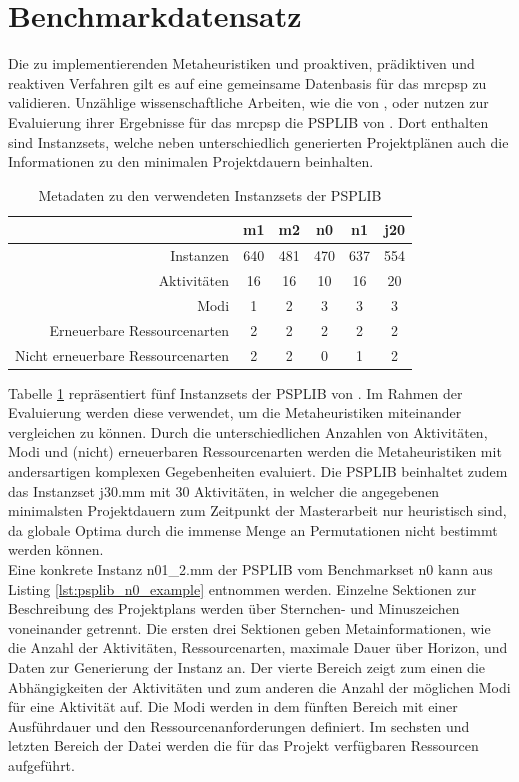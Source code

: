 \section{Benchmarkdatensatz} \label{sec:Benchmarkdatensatz}

Die zu implementierenden Metaheuristiken und proaktiven, prädiktiven und reaktiven Verfahren gilt es auf eine gemeinsame Datenbasis für das \ac{mrcpsp} zu validieren. Unzählige wissenschaftliche Arbeiten, wie die von \cite{rezaeian_using_2015}, \cite{jozefowska_simulated_2001} oder \cite{al-fawzan_bi-objective_2005} nutzen zur Evaluierung ihrer Ergebnisse für das \ac{mrcpsp} die PSPLIB von \cite{kolisch_psplib_1997}. Dort enthalten sind Instanzsets, welche neben unterschiedlich generierten Projektplänen auch die Informationen zu den minimalen Projektdauern beinhalten. 

\begin{table}[H]
\centering
\begin{tabular}{r|ccccc}
& m1  & m2  & n0  & n1  & j20 \\ \hline
Instanzen & 640 & 481 & 470 & 637 & 554 \\ \hline
Aktivitäten & 16  & 16  & 10  & 16  & 20  \\
Modi & 1   & 2   & 3   & 3   & 3   \\ \hline
Erneuerbare Ressourcenarten & 2   & 2   & 2   & 2   & 2   \\
Nicht erneuerbare Ressourcenarten & 2   & 2   & 0   & 1   & 2  
\end{tabular}

\caption{Metadaten zu den verwendeten Instanzsets der PSPLIB \cite{kolisch_psplib_1997}}
\label{tab:instanzsets}
\end{table}

Tabelle \ref{tab:instanzsets} repräsentiert fünf Instanzsets der PSPLIB von \cite{kolisch_psplib_1997}. Im Rahmen der Evaluierung werden diese verwendet, um die Metaheuristiken miteinander vergleichen zu können. Durch die unterschiedlichen Anzahlen von Aktivitäten, Modi und (nicht) erneuerbaren Ressourcenarten werden die Metaheuristiken mit andersartigen komplexen Gegebenheiten evaluiert. Die PSPLIB beinhaltet zudem das Instanzset j30.mm mit 30 Aktivitäten, in welcher die angegebenen minimalsten Projektdauern zum Zeitpunkt der Masterarbeit nur heuristisch sind, da globale Optima durch die immense Menge an Permutationen nicht bestimmt werden können.\\

Eine konkrete Instanz n01\_2.mm der PSPLIB vom Benchmarkset n0 kann aus Listing \ref{lst:psplib_n0_example} entnommen werden. Einzelne Sektionen zur Beschreibung des Projektplans werden über Sternchen- und Minuszeichen voneinander getrennt. Die ersten drei Sektionen geben Metainformationen, wie die Anzahl der Aktivitäten, Ressourcenarten, maximale Dauer über Horizon, und Daten zur Generierung der Instanz an. Der vierte Bereich zeigt zum einen die Abhängigkeiten der Aktivitäten und zum anderen die Anzahl der möglichen Modi für eine Aktivität auf. Die Modi werden in dem fünften Bereich mit einer Ausführdauer und den Ressourcenanforderungen definiert. Im sechsten und letzten Bereich der Datei werden die für das Projekt verfügbaren Ressourcen aufgeführt. 

